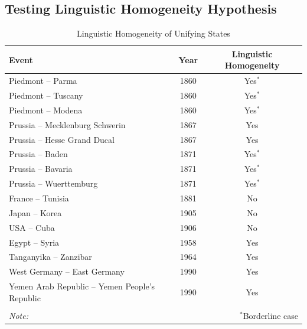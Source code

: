 \documentclass{beamer}
\begin{document}
	\subsection{Testing Linguistic Homogeneity Hypothesis}

	\begin{frame}
		\begin{table}
			\centering
			\footnotesize
			\caption{Linguistic Homogeneity of Unifying States}
			\begin{tabular}{lcc}
				\toprule
				Event & Year & Linguistic Homogeneity\\
				\midrule
				Piedmont -- Parma & 1860 & Yes$^*$ \\
				Piedmont -- Tuscany & 1860 & Yes$^*$ \\
				Piedmont -- Modena & 1860 & Yes$^*$ \\
				Prussia -- Mecklenburg Schwerin & 1867 & Yes \\
				Prussia -- Hesse Grand Ducal & 1867 & Yes \\
				Prussia -- Baden & 1871 & Yes$^*$ \\
				Prussia -- Bavaria & 1871 & Yes$^*$ \\
				Prussia -- Wuerttemburg & 1871 & Yes$^*$ \\
				France -- Tunisia & 1881 & No \\
				Japan -- Korea & 1905 & No \\
				USA -- Cuba & 1906 & No \\
				Egypt -- Syria & 1958 & Yes \\
				Tanganyika -- Zanzibar & 1964 & Yes \\
				West Germany -- East Germany & 1990 & Yes \\
				Yemen Arab Republic -- Yemen People's Republic & 1990 & Yes \\
				\bottomrule
				\\[-1.8ex] 
				\textit{Note:} & \multicolumn{2}{r}{$^*$Borderline case} \\
			\end{tabular}
		\end{table}
	\end{frame}
\end{document}
